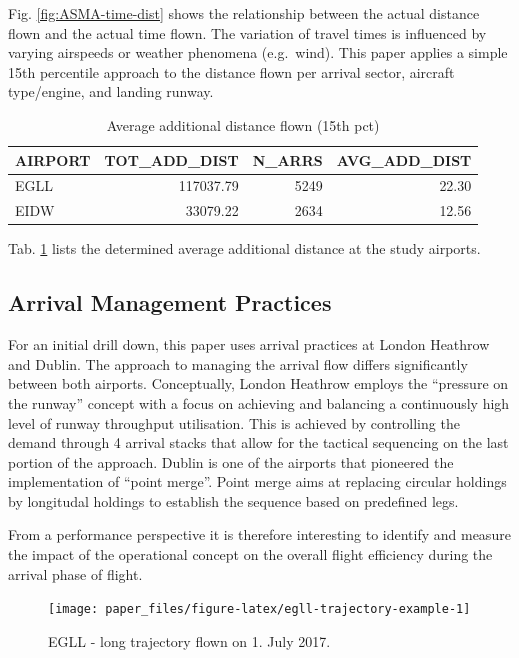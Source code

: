 \documentclass[conference,final,a4paper,]{IEEEtran}
\begin{document}
Fig. \ref{fig:ASMA-time-dist} shows the relationship between the actual
distance flown and the actual time flown. The variation of travel times
is influenced by varying airspeeds or weather phenomena (e.g.~wind).
This paper applies a simple 15th percentile approach to the distance
flown per arrival sector, aircraft type/engine, and landing runway.

\begin{table}[t]

\caption{\label{tab:tbl-asma-dist}Average additional distance flown (15th pct)}
\centering
\begin{tabular}{l|r|r|r}
\hline
AIRPORT & TOT\_ADD\_DIST & N\_ARRS & AVG\_ADD\_DIST\\
\hline
EGLL & 117037.79 & 5249 & 22.30\\
\hline
EIDW & 33079.22 & 2634 & 12.56\\
\hline
\end{tabular}
\end{table}

Tab. \ref{tab:tbl-asma-dist} lists the determined average additional
distance at the study airports.

\subsection{Arrival Management
Practices}\label{arrival-management-practices}

For an initial drill down, this paper uses arrival practices at London
Heathrow and Dublin. The approach to managing the arrival flow differs
significantly between both airports. Conceptually, London Heathrow
employs the ``pressure on the runway'' concept with a focus on achieving
and balancing a continuously high level of runway throughput
utilisation. This is achieved by controlling the demand through 4
arrival stacks that allow for the tactical sequencing on the last
portion of the approach. Dublin is one of the airports that pioneered
the implementation of ``point merge''. Point merge aims at replacing
circular holdings by longitudal holdings to establish the sequence based
on predefined legs.

From a performance perspective it is therefore interesting to identify
and measure the impact of the operational concept on the overall flight
efficiency during the arrival phase of flight.




\begin{figure}[H]

{\centering \texttt{[image: paper\_files/figure-latex/egll-trajectory-example-1]} 

}

\caption{EGLL - long trajectory flown on 1. July
2017.}\label{fig:egll-trajectory-example}
\end{figure}
\end{document}
